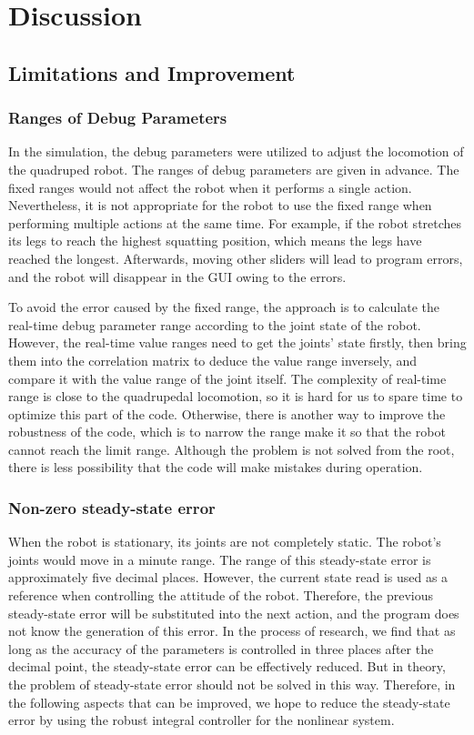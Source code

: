 \chapter{Discussion}

\section{Limitations and Improvement}

\subsection{Ranges of Debug Parameters}

In the simulation, the debug parameters were utilized to adjust the locomotion of the quadruped robot. The ranges of debug parameters are given in advance. The fixed ranges would not affect the robot when it performs a single action. Nevertheless, it is not appropriate for the robot to use the fixed range when performing multiple actions at the same time. For example, if the robot stretches its legs to reach the highest squatting position, which means the legs have reached the longest. Afterwards, moving other sliders will lead to program errors, and the robot will disappear in the GUI\cite{ref:GUI} owing to the errors.

To avoid the error caused by the fixed range, the approach is to calculate the real-time debug parameter range according to the joint state of the robot. However, the real-time value ranges need to get the joints' state firstly, then bring them into the correlation matrix to deduce the value range inversely, and compare it with the value range of the joint itself. The complexity of real-time range is close to the quadrupedal locomotion, so it is hard for us to spare time to optimize this part of the code. Otherwise, there is another way to improve the robustness of the code, which is to narrow the range make it so that the robot cannot reach the limit range. Although the problem is not solved from the root, there is less possibility that the code will make mistakes during operation.

\subsection{Non-zero steady-state error}

When the robot is stationary, its joints are not completely static. The robot's joints would move in a minute range. The range of this steady-state error is approximately five decimal places. However, the current state read is used as a reference when controlling the attitude of the robot. Therefore, the previous steady-state error will be substituted into the next action, and the program does not know the generation of this error. In the process of research, we find that as long as the accuracy of the parameters is controlled in three places after the decimal point, the steady-state error can be effectively reduced. But in theory, the problem of steady-state error should not be solved in this way. Therefore, in the following aspects that can be improved, we hope to reduce the steady-state error by using the robust integral controller\cite{ref:RNIcontrol} for the nonlinear system.

